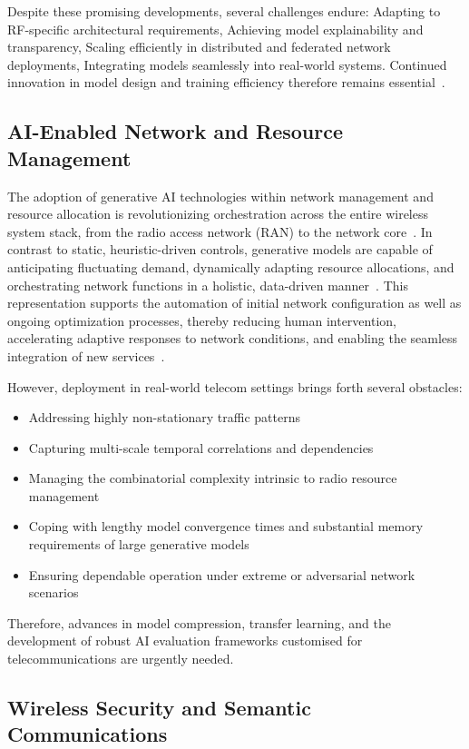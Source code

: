 \documentclass[sigconf]{acmart}
\begin{document}
Despite these promising developments, several challenges endure:
Adapting to RF-specific architectural requirements,
Achieving model explainability and transparency,
Scaling efficiently in distributed and federated network deployments,
Integrating models seamlessly into real-world systems.
Continued innovation in model design and training efficiency therefore remains essential~\cite{ref15,ref36}.

\subsection{AI-Enabled Network and Resource Management}

The adoption of generative AI technologies within network management and resource allocation is revolutionizing orchestration across the entire wireless system stack, from the radio access network (RAN) to the network core~\cite{ref44}. In contrast to static, heuristic-driven controls, generative models are capable of anticipating fluctuating demand, dynamically adapting resource allocations, and orchestrating network functions in a holistic, data-driven manner~\cite{ref44,ref46}. This representation supports the automation of initial network configuration as well as ongoing optimization processes, thereby reducing human intervention, accelerating adaptive responses to network conditions, and enabling the seamless integration of new services~\cite{ref46}.

However, deployment in real-world telecom settings brings forth several obstacles:
\begin{itemize}
    \item Addressing highly non-stationary traffic patterns
    \item Capturing multi-scale temporal correlations and dependencies
    \item Managing the combinatorial complexity intrinsic to radio resource management
    \item Coping with lengthy model convergence times and substantial memory requirements of large generative models
    \item Ensuring dependable operation under extreme or adversarial network scenarios
\end{itemize}
Therefore, advances in model compression, transfer learning, and the development of robust AI evaluation frameworks customised for telecommunications are urgently needed.

\subsection{Wireless Security and Semantic Communications}
\end{document}
